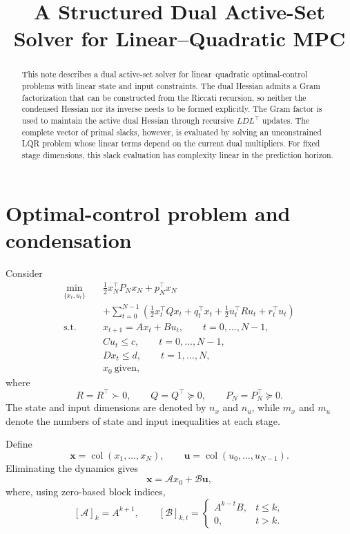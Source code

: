 \documentclass[11pt]{article}
\title{A Structured Dual Active-Set Solver for Linear--Quadratic MPC}
\author{}
\date{}
\newcommand{\col}{\operatorname{col}}
\begin{document}
\maketitle

\begin{abstract}
This note describes a dual active-set solver for linear--quadratic
optimal-control problems with linear state and input constraints.
The dual Hessian admits a Gram factorization that can be constructed
from the Riccati recursion, so neither the condensed Hessian nor its
inverse needs to be formed explicitly. The Gram factor is used to
maintain the active dual Hessian through recursive \(LDL^\top\)
updates. The complete vector of primal slacks, however, is evaluated
by solving an unconstrained LQR problem whose linear terms depend on
the current dual multipliers. For fixed stage dimensions, this slack
evaluation has complexity linear in the prediction horizon.
\end{abstract}

\section{Optimal-control problem and condensation}

Consider
\begin{equation}
\begin{aligned}
\min_{\{x_t,u_t\}}\quad&
 \frac{1}{2}x_N^\top P_Nx_N+p_N^\top x_N\\
&+\sum_{t=0}^{N-1}
 \left(
 \frac{1}{2}x_t^\top Qx_t+q_t^\top x_t
 +\frac{1}{2}u_t^\top Ru_t+r_t^\top u_t
 \right)\\
\text{s.t.}\quad&
 x_{t+1}=Ax_t+Bu_t,\qquad t=0,\ldots,N-1,\\
&Cu_t\leq c,\qquad t=0,\ldots,N-1,\\
&Dx_t\leq d,\qquad t=1,\ldots,N,\\
&x_0\ \text{given},
\end{aligned}
\label{eq:ocp}
\end{equation}
where
\[
R=R^\top\succ0,\qquad
Q=Q^\top\succeq0,\qquad
P_N=P_N^\top\succeq0.
\]
The state and input dimensions are denoted by \(n_x\) and \(n_u\),
while \(m_x\) and \(m_u\) denote the numbers of state and input
inequalities at each stage.

Define
\[
\bm{x}=\col(x_1,\ldots,x_N),\qquad
\bm{u}=\col(u_0,\ldots,u_{N-1}).
\]
Eliminating the dynamics gives
\begin{equation}
\bm{x}=\mathcal A x_0+\mathcal B\bm{u},
\label{eq:state-condensing}
\end{equation}
where, using zero-based block indices,
\[
[\mathcal A]_k=A^{k+1},\qquad
[\mathcal B]_{k,t}=
\begin{cases}
A^{k-t}B,&t\leq k,\\
0,&t>k.
\end{cases}
\]
\end{document}
